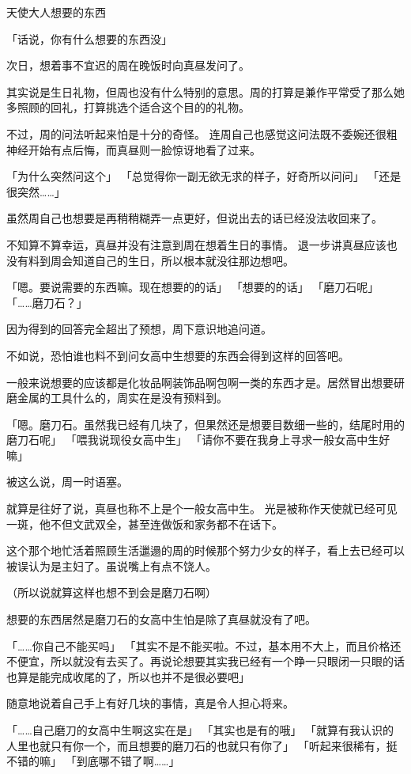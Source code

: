 天使大人想要的东西

「话说，你有什么想要的东西没」

次日，想着事不宜迟的周在晚饭时向真昼发问了。

其实说是生日礼物，但周也没有什么特别的意思。周的打算是兼作平常受了那么她多照顾的回礼，打算挑选个适合这个目的的礼物。

不过，周的问法听起来怕是十分的奇怪。
连周自己也感觉这问法既不委婉还很粗神经开始有点后悔，而真昼则一脸惊讶地看了过来。

「为什么突然问这个」
「总觉得你一副无欲无求的样子，好奇所以问问」
「还是很突然……」

虽然周自己也想要是再稍稍糊弄一点更好，但说出去的话已经没法收回来了。

不知算不算幸运，真昼并没有注意到周在想着生日的事情。
退一步讲真昼应该也没有料到周会知道自己的生日，所以根本就没往那边想吧。

「嗯。要说需要的东西嘛。现在想要的的话」
「想要的的话」
「磨刀石呢」
「……磨刀石？」

因为得到的回答完全超出了预想，周下意识地追问道。

不如说，恐怕谁也料不到问女高中生想要的东西会得到这样的回答吧。

一般来说想要的应该都是化妆品啊装饰品啊包啊一类的东西才是。居然冒出想要研磨金属的工具什么的，周实在是没有预料到。

「嗯。磨刀石。虽然我已经有几块了，但果然还是想要目数细一些的，结尾时用的磨刀石呢」
「喂我说现役女高中生」
「请你不要在我身上寻求一般女高中生好嘛」

被这么说，周一时语塞。

就算是往好了说，真昼也称不上是个一般女高中生。
光是被称作天使就已经可见一斑，他不但文武双全，甚至连做饭和家务都不在话下。

这个那个地忙活着照顾生活邋遢的周的时候那个努力少女的样子，看上去已经可以被误认为是主妇了。虽说嘴上有点不饶人。

（所以说就算这样也想不到会是磨刀石啊）

想要的东西居然是磨刀石的女高中生怕是除了真昼就没有了吧。

「……你自己不能买吗」
「其实不是不能买啦。不过，基本用不大上，而且价格还不便宜，所以就没有去买了。再说论想要其实我已经有一个睁一只眼闭一只眼的话也算是能完成收尾的了，所以也并不是很必要吧」

随意地说着自己手上有好几块的事情，真是令人担心将来。

「……自己磨刀的女高中生啊这实在是」
「其实也是有的哦」
「就算有我认识的人里也就只有你一个，而且想要的磨刀石的也就只有你了」
「听起来很稀有，挺不错的嘛」
「到底哪不错了啊……」

